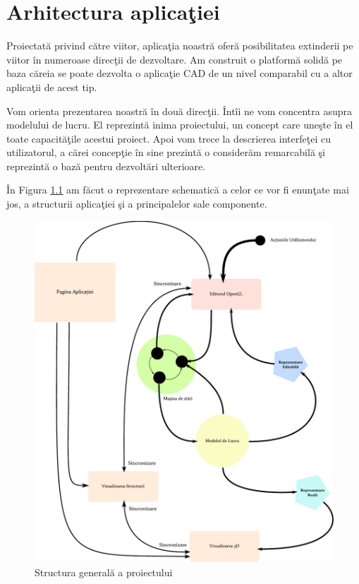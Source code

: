 \chapter{Arhitectura aplicaţiei}
\label{chapter:arh}

Proiectată privind către viitor, aplicaţia noastră oferă posibilitatea 
extinderii pe viitor în numeroase direcţii de dezvoltare. Am construit o 
platformă solidă pe baza căreia se poate dezvolta o aplicaţie CAD de un nivel 
comparabil cu a altor aplicaţii de acest tip.

Vom orienta prezentarea noastră în două direcţii. Întîi ne vom concentra asupra 
modelului de lucru. El reprezintă inima proiectului, un concept care uneşte în 
el toate capacităţile acestui proiect. Apoi vom trece la descrierea interfeţei 
cu utilizatorul, a cărei concepţie în sine prezintă o considerăm remarcabilă şi 
reprezintă o bază pentru dezvoltări ulterioare.

În Figura \ref{figure:arh} am făcut o reprezentare schematică a celor ce vor fi
enunţate mai jos, a structurii aplicaţiei şi a principalelor sale componente.

\begin{figure}[htp]
\begin{center}
  \includegraphics[width=\textwidth]{figures/arh-svg.pdf}
  \caption{Structura generală a proiectului \label{figure:arh}}
\end{center}
\end{figure}

